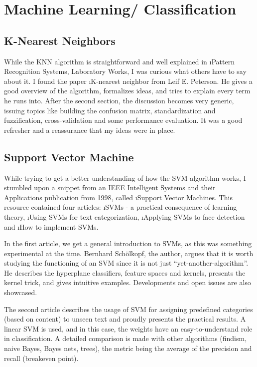 \section{Machine Learning/ Classification}



\subsection{K-Nearest Neighbors}

While the KNN algorithm is straightforward and well explained in \i{Pattern Recognition Systems, Laboratory Works}\cite{prs_labs}, I was curious what others have to say about it. I found the paper \i{K-nearest neighbor from Leif E. Peterson}\cite{knn}. He gives a good overview of the algorithm, formalizes ideas, and tries to explain every term he runs into. After the second section, the discussion becomes very generic, issuing topics like building the confusion matrix, standardization and fuzzification, cross-validation and some performance evaluation. It was a good refresher and a reassurance that my ideas were in place.



\subsection{Support Vector Machine}

While trying to get a better understanding of how the SVM algorithm works, I stumbled upon a snippet from an IEEE Intelligent Systems and their Applications publication from 1998, called \i{Support Vector Machines}\cite{svm}. This resource contained four articles: \i{SVMs - a practical consequence of learning theory}, \i{Using SVMs for text categorization}, \i{Applying SVMs to face detection} and \i{How to implement SVMs}.

In the first article, we get a general introduction to SVMs, as this was something experimental at the time. Bernhard Schölkopf, the author, argues that it is worth studying the functioning of an SVM since it is not just ``yet-another-algorithm''. He describes the hyperplane classifiers, feature spaces and kernels, presents the kernel trick, and gives intuitive examples. Developments and open issues are also showcased.

The second article describes the usage of SVM for assigning predefined categories (based on content) to unseen text and proudly presents the practical results. A linear SVM is used, and in this case, the weights have an easy-to-understand role in classification. A detailed comparison is made with other algorithms (findism, naive Bayes, Bayes nets, trees), the metric being the average of the precision and recall (breakeven point).

